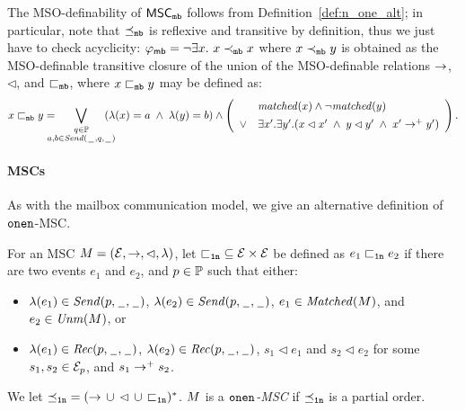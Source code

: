 The MSO-definability of $\mathsf{MSC}_{\mathtt{mb}}$ follows from Definition~\ref{def:n_one_alt}; in particular, note that 
$\preceq_{\mathtt{mb}}$ is reflexive and transitive by definition, 
thus we just have to check acyclicity:
$
	\varphi_{\mathsf{mb}} = \neg \exists x.\ x \prec_{\mathtt{mb}} x 
$
where $x \prec_{\mathtt{mb}} y$ is obtained as the MSO-definable transitive closure of
the union of the MSO-definable relations $\to$, $\lhd$, and $\sqsubset_{\mathtt{mb}}$,  
where $x \sqsubset_{\mathtt{mb}} y$ may be defined as:
\[
x \sqsubset_{\mathtt{mb}} y =
\displaystyle
\hspace{-1em}\bigvee_{\substack{q \in \mathbb{P}\\a,b \in {\mathit{Send}(\hspace{0.1em}\underline{\hspace{0.5em}}\hspace{0.1em},q,\hspace{0.1em}\underline{\hspace{0.5em}}\hspace{0.1em})}}}\hspace{-1em}
(\lambda(x) = a \;\wedge\; \lambda(y) = b)
\wedge
\left(
\begin{array}{rl}
& \mathit{matched}(x) \wedge \neg \mathit{matched}(y)\\[1ex]
\vee & \exists x'.\exists y'. (x \lhd x' \;\wedge\; y \lhd y' \;\wedge\; x' \to^+ y')
\end{array}
\right).
\]



\paragraph{\bf \onen MSCs}

As with the mailbox communication model, we give an alternative definition of $\mathtt{onen}$-MSC.

\begin{definition} \label{def:one_n_alt}
	For an MSC $M = (\mathcal{E},\to,\lhd,\lambda)$, let ${\sqsubset_{\mathtt{1n}}} \subseteq \mathcal{E} \times \mathcal{E}$ be defined as $e_1 \sqsubset_{\mathtt{1n}} e_2$ if there are two events $e_1$ and $e_2$, and $p \in \mathbb{P}$ such that either:
	\begin{itemize}%
		\item $\lambda(e_1) \in {\mathit{Send}(p,\hspace{0.1em}\underline{\hspace{0.5em}}\hspace{0.1em},\hspace{0.1em}\underline{\hspace{0.5em}}\hspace{0.1em})}$, $\lambda(e_2) \in {\mathit{Send}(p,\hspace{0.1em}\underline{\hspace{0.5em}}\hspace{0.1em},\hspace{0.1em}\underline{\hspace{0.5em}}\hspace{0.1em})}$, $e_1 \in \mathit{Matched}(M)$, and $e_2 \in \mathit{Unm}(M)$, or
		\item $\lambda(e_1) \in {\mathit{Rec}(p,\hspace{0.1em}\underline{\hspace{0.5em}}\hspace{0.1em},\hspace{0.1em}\underline{\hspace{0.5em}}\hspace{0.1em})}$, $\lambda(e_2) \in {\mathit{Rec}(p,\hspace{0.1em}\underline{\hspace{0.5em}}\hspace{0.1em},\hspace{0.1em}\underline{\hspace{0.5em}}\hspace{0.1em})}$, $s_1 \lhd e_1$ and $s_2 \lhd e_2$ for some $s_1,s_2 \in \mathcal{E}_p$, and $s_1 \to^+ s_2$.
	\end{itemize}

	We let ${\preceq_{\mathtt{1n}}} = ({\to} \,\cup\, {\lhd} \,\cup\, {\sqsubset_{\mathtt{1n}}})^\ast$.
	$M$ is a \emph{$\mathtt{onen}$-MSC}
	if ${\preceq_{\mathtt{1n}}}$ is a partial order.
\end{definition}

